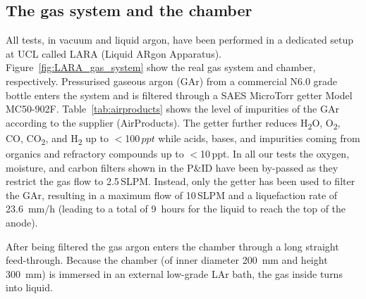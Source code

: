 \documentclass[a4paper,11pt]{article}
\begin{document}
\subsection{The gas system and the chamber}
All tests, in vacuum and liquid argon, have been performed in a dedicated setup at UCL called LARA (Liquid ARgon Apparatus). 
Figure~\ref{fig:LARA_gas_system} show the real gas system and chamber, respectively. Pressurised gaseous argon (GAr) from a commercial N6.0 grade bottle enters the system and is filtered through a SAES MicroTorr getter Model MC50-902F. Table~\ref{tab:airproducts} shows the level of impurities of the GAr according to the supplier (AirProducts). The getter further reduces H\textsubscript{2}O, O\textsubscript{2}, CO, CO\textsubscript{2}, and H\textsubscript{2} up to $<$100\,$ppt$ while acids, bases, and impurities coming from organics and refractory compounds up to $<$10\,ppt. In all our tests the oxygen, moisture, and carbon filters shown in the P\&ID have been by-passed as they restrict the gas flow to 2.5\,SLPM. Instead, only the getter has been used to filter the GAr, resulting in a maximum flow of 10\,SLPM and a liquefaction rate of \SI{23.6}{mm/h} (leading to a total of \SI{9}{hours} for the liquid to reach the top of the anode).

After being filtered the gas argon enters the chamber through a long straight feed-through. Because the chamber (of inner diameter \SI{200}{\mm} and height \SI{300}{\mm}) is immersed in an external low-grade LAr bath, the gas inside turns into liquid. 
\end{document}
